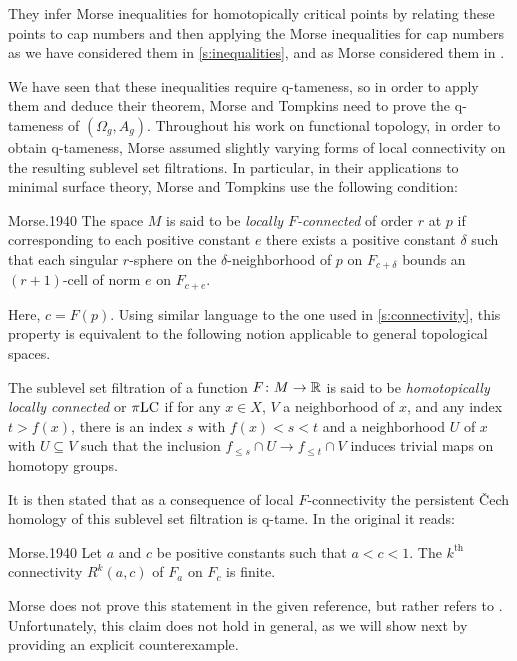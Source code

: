They infer Morse inequalities for homotopically critical points by relating these points to cap numbers and then applying the Morse inequalities for cap numbers as we have considered them in \cref{s:inequalities}, and as Morse considered them in \cite{Morse.1940}.

We have seen that these inequalities require q-tameness, so in order to apply them and deduce their theorem, Morse and Tompkins need to prove the \mbox{q-tameness} of $(\Omega_g, A_g)$.
Throughout his work on functional topology, in order to obtain \mbox{q-tameness}, Morse assumed slightly varying forms of local connectivity on the resulting sublevel set filtrations.
In particular, in their applications to minimal surface theory, Morse and Tompkins use the following condition:
\begin{displaycquote}[p.~431]{Morse.1940}
	The space $M$ is said to be \textit{locally $F$-connected} of order $r$ at $p$ if corresponding to each positive constant $e$ there exists a positive constant $\delta$ such that each singular $r$-sphere on the $\delta$-neighborhood of $p$ on $F_{c+\delta}$ bounds an $(r+1)$-cell of norm $e$ on $F_{c+e}$.
\end{displaycquote}
Here, $c = F(p)$.
Using similar language to the one used in \cref{s:connectivity}, this property is equivalent to the following notion applicable to general topological spaces.

\begin{defi}
    The sublevel set filtration of a function $F \colon M \to \mathbb{R}$ is said to be \emph{homotopically locally connected} or $\pi\mathrm{LC}$	if for any $x \in X$, $V$ a neighborhood of $x$, and any index $t > f(x)$, there is an index $s$ with  $f(x) < s < t$ and a neighborhood $U$ of $x$ with $U \subseteq V$ such that the inclusion $f_{\leq s} \cap U \to f_{\leq t} \cap V$ induces trivial maps on homotopy groups.
\end{defi}

It is then stated that as a consequence of local $F$-connectivity the persistent \v{C}ech homology of this sublevel set filtration is q-tame.
In the original it reads:

\begin{displaycquote}[Theorem 6.3, p.~432]{Morse.1940}
	Let $a$ and $c$ be positive constants such that $a < c < 1$.
	The $k^{\mathrm{th}}$ connectivity $R^k(a,c)$ of $F_a$ on $F_c$ is finite.
\end{displaycquote}
Morse does not prove this statement in the given reference, but rather refers to \cite[Theorem~6.1]{Morse.1938}.
Unfortunately, this claim does not hold in general, as we will show next by providing an explicit counterexample.

